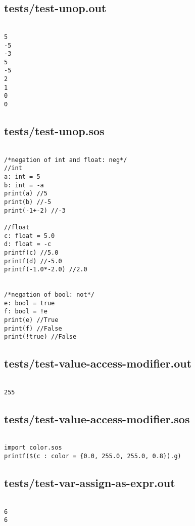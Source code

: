 \documentclass[main.tex]{subfiles}
\begin{document}
\subsection{tests/test-unop.out}

\begin{lstlisting}

5
-5
-3
5
-5
2
1
0
0
\end{lstlisting}

\subsection{tests/test-unop.sos}

\begin{lstlisting}

/*negation of int and float: neg*/
//int
a: int = 5
b: int = -a
print(a) //5
print(b) //-5
print(-1+-2) //-3

//float
c: float = 5.0
d: float = -c
printf(c) //5.0
printf(d) //-5.0
printf(-1.0*-2.0) //2.0


/*negation of bool: not*/
e: bool = true
f: bool = !e
print(e) //True
print(f) //False
print(!true) //False
\end{lstlisting}

\subsection{tests/test-value-access-modifier.out}

\begin{lstlisting}

255
\end{lstlisting}

\subsection{tests/test-value-access-modifier.sos}

\begin{lstlisting}

import color.sos
printf($(c : color = {0.0, 255.0, 255.0, 0.8}).g)\end{lstlisting}

\subsection{tests/test-var-assign-as-expr.out}

\begin{lstlisting}

6
6
\end{lstlisting}
\end{document}
